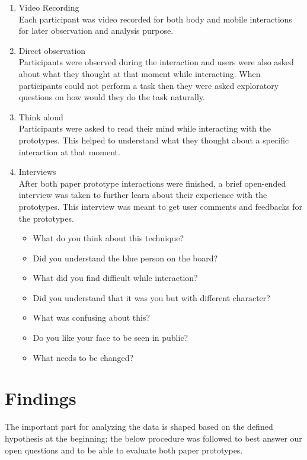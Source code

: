 \begin{enumerate}
\item Video Recording \\
Each participant was video recorded for both body and mobile interactions for later observation and analysis purpose. 

\item Direct observation \\
Participants were observed during the interaction and users were also asked about what they thought at that moment while interacting. When participants could not perform a task then they were asked exploratory questions on how would they do the task naturally.

\item Think aloud \\
Participants were asked to read their mind while interacting with the prototypes. This helped to understand what they thought about a specific interaction at that moment. 

\item Interviews \\
After both paper prototype interactions were finished, a brief open-ended interview was taken to further learn about their experience with the prototypes. This interview was meant to get user comments and feedbacks for the prototypes. 


\begin{itemize}
\item What do you think about this technique?
\item Did you understand the blue person on the board?
\item What did you find difficult while interaction?
\item Did you understand that it was you but with different character?
\item What was confusing about this?
\item Do you like your face to be seen in public?
\item What needs to be changed?
\end{itemize}



\end{enumerate}




\section{Findings}
The important part for analyzing the data is shaped based on the defined hypothesis at the beginning; the below procedure was followed to best answer our open questions and to be able to evaluate both paper prototypes. 


